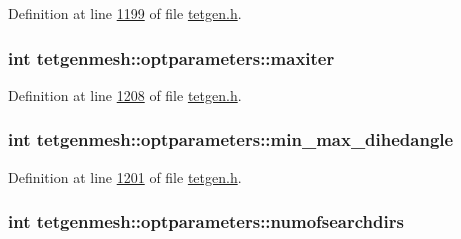 Definition at line \hyperlink{tetgen_8h_source_l01199}{1199} of file \hyperlink{tetgen_8h_source}{tetgen.\+h}.

\subsubsection[{\texorpdfstring{maxiter}{maxiter}}]{\setlength{\rightskip}{0pt plus 5cm}int tetgenmesh\+::optparameters\+::maxiter}\hypertarget{classtetgenmesh_1_1optparameters_a0f2b3bd97f2120bdb77acb9e89026196}{}\label{classtetgenmesh_1_1optparameters_a0f2b3bd97f2120bdb77acb9e89026196}


Definition at line \hyperlink{tetgen_8h_source_l01208}{1208} of file \hyperlink{tetgen_8h_source}{tetgen.\+h}.

\subsubsection[{\texorpdfstring{min\+\_\+max\+\_\+dihedangle}{min_max_dihedangle}}]{\setlength{\rightskip}{0pt plus 5cm}int tetgenmesh\+::optparameters\+::min\+\_\+max\+\_\+dihedangle}\hypertarget{classtetgenmesh_1_1optparameters_ab391511f633b84180d0e6cc52510e343}{}\label{classtetgenmesh_1_1optparameters_ab391511f633b84180d0e6cc52510e343}


Definition at line \hyperlink{tetgen_8h_source_l01201}{1201} of file \hyperlink{tetgen_8h_source}{tetgen.\+h}.

\subsubsection[{\texorpdfstring{numofsearchdirs}{numofsearchdirs}}]{\setlength{\rightskip}{0pt plus 5cm}int tetgenmesh\+::optparameters\+::numofsearchdirs}\hypertarget{classtetgenmesh_1_1optparameters_af6ea36aeb4f65aa694e3df5c6dcd3a8d}{}\label{classtetgenmesh_1_1optparameters_af6ea36aeb4f65aa694e3df5c6dcd3a8d}


